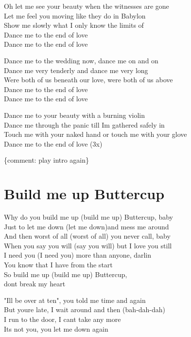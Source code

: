 \documentclass[
  letterpaper,
  twoside=false]{scrbook}
\begin{document}
Oh let me see your beauty when the witnesses are gone\\
Let me feel you moving like they do in Babylon\\
Show me slowly what I only know the limits of\\
Dance me to the end of love\\
Dance me to the end of love

Dance me to the wedding now, dance me on and on\\
Dance me very tenderly and dance me very long\\
We\textquotesingle re both of us beneath our love, we\textquotesingle re
both of us above\\
Dance me to the end of love\\
Dance me to the end of love

Dance me to your beauty with a burning violin\\
Dance me through the panic till I\textquotesingle m gathered safely in\\
Touch me with your naked hand or touch me with your glove\\
Dance me to the end of love (3x)

\{comment: play intro again\}

\hypertarget{build-me-up-buttercup}{%
\chapter{Build me up Buttercup}\label{build-me-up-buttercup}}

Why do you build me up (build me up) Buttercup, baby\\
Just to let me down (let me down)and mess me around\\
And then worst of all (worst of all) you never call, baby\\
When you say you will (say you will) but I love you still\\
I need you (I need you) more than anyone, darlin\textquotesingle{}\\
You know that I have from the start\\
So build me up (build me up) Buttercup,\\
don\textquotesingle t break my heart

"I\textquotesingle ll be over at ten", you told me time and again\\
But you\textquotesingle re late, I wait around and then (bah-dah-dah)\\
I run to the door, I can\textquotesingle t take any more\\
It\textquotesingle s not you, you let me down again
\end{document}
